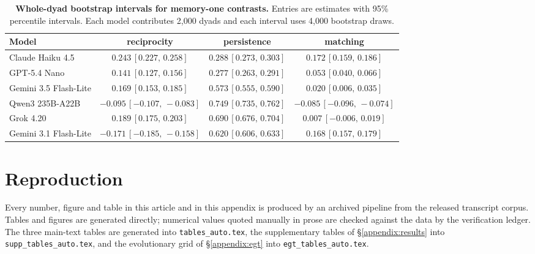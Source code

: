 \documentclass[11pt,a4paper]{article}
\begin{document}
\begin{table}[htbp]
\centering
\footnotesize
\setlength{\tabcolsep}{4pt}
\caption{\textbf{Whole-dyad bootstrap intervals for memory-one contrasts.} Entries are estimates with 95\% percentile intervals. Each model contributes 2,000 dyads and each interval uses 4,000 bootstrap draws.}
\label{tab:conditioning-ci}
\begin{tabular}{@{}lccc@{}}
\toprule
Model & reciprocity & persistence & matching \\
\midrule
Claude Haiku 4.5 & $0.243\,[0.227,\,0.258]$ & $0.288\,[0.273,\,0.303]$ & $0.172\,[0.159,\,0.186]$ \\
GPT-5.4 Nano & $0.141\,[0.127,\,0.156]$ & $0.277\,[0.263,\,0.291]$ & $0.053\,[0.040,\,0.066]$ \\
Gemini 3.5 Flash-Lite & $0.169\,[0.153,\,0.185]$ & $0.573\,[0.555,\,0.590]$ & $0.020\,[0.006,\,0.035]$ \\
Qwen3 235B-A22B & $-0.095\,[-0.107,\,-0.083]$ & $0.749\,[0.735,\,0.762]$ & $-0.085\,[-0.096,\,-0.074]$ \\
Grok 4.20 & $0.189\,[0.175,\,0.203]$ & $0.690\,[0.676,\,0.704]$ & $0.007\,[-0.006,\,0.019]$ \\
Gemini 3.1 Flash-Lite & $-0.171\,[-0.185,\,-0.158]$ & $0.620\,[0.606,\,0.633]$ & $0.168\,[0.157,\,0.179]$ \\
\bottomrule
\end{tabular}
\end{table}


\section{Reproduction}\label{appendix:repro}

Every number, figure and table in this article and in this appendix is produced by an archived pipeline from the released transcript corpus. Tables and figures are generated directly; numerical values quoted manually in prose are checked against the data by the verification ledger. The three main-text tables are generated into \texttt{tables\_auto.tex}, the supplementary tables of \S\ref{appendix:results} into \texttt{supp\_tables\_auto.tex}, and the evolutionary grid of \S\ref{appendix:egt} into \texttt{egt\_tables\_auto.tex}.
\end{document}
